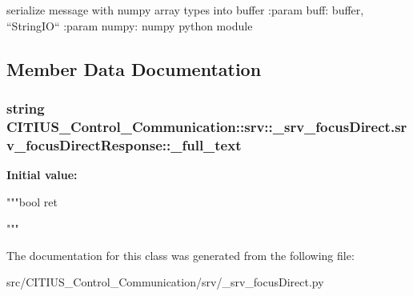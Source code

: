 \begin{DoxyVerb}
serialize message with numpy array types into buffer
:param buff: buffer, ``StringIO``
:param numpy: numpy python module
\end{DoxyVerb}
 

\subsection{\-Member \-Data \-Documentation}
\hypertarget{class_c_i_t_i_u_s___control___communication_1_1srv_1_1__srv__focus_direct_1_1srv__focus_direct_response_afe52bff6de6af3de3bf4635273228cc3}{
\subsubsection[{\-\_\-full\-\_\-text}]{\setlength{\rightskip}{0pt plus 5cm}string \-C\-I\-T\-I\-U\-S\-\_\-\-Control\-\_\-\-Communication\-::srv\-::\-\_\-srv\-\_\-focus\-Direct.\-srv\-\_\-focus\-Direct\-Response\-::\-\_\-full\-\_\-text}}\label{class_c_i_t_i_u_s___control___communication_1_1srv_1_1__srv__focus_direct_1_1srv__focus_direct_response_afe52bff6de6af3de3bf4635273228cc3}
{\bfseries \-Initial value\-:}
\begin{DoxyCode}
"""bool ret


"""
\end{DoxyCode}


\-The documentation for this class was generated from the following file\-:\begin{DoxyCompactItemize}
\item 
src/\-C\-I\-T\-I\-U\-S\-\_\-\-Control\-\_\-\-Communication/srv/\-\_\-srv\-\_\-focus\-Direct.\-py\end{DoxyCompactItemize}
